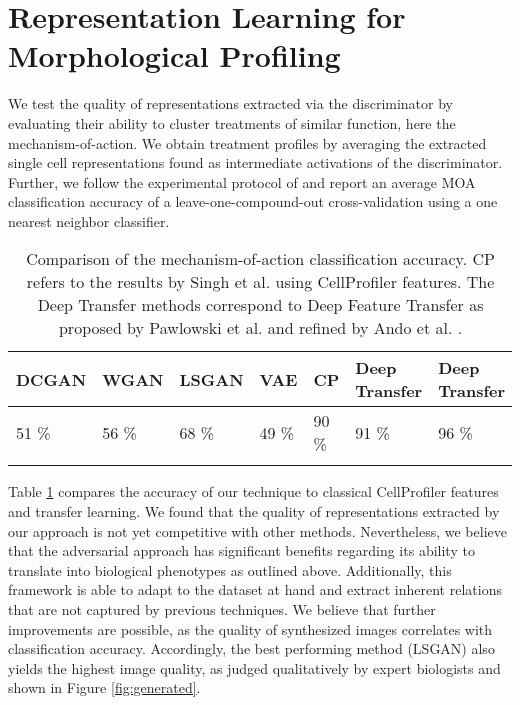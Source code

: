 \documentclass{article}
\begin{document}
\section{Representation Learning for Morphological Profiling}\label{moa}
We test the quality of representations extracted via the discriminator by evaluating their ability to cluster treatments of similar function, here the mechanism-of-action. We obtain treatment profiles by averaging the extracted single cell representations found as intermediate activations of the discriminator. Further, we follow the experimental protocol of \cite{Ljosa2013} and report an average MOA classification accuracy of a leave-one-compound-out cross-validation using a one nearest neighbor classifier.
\begin{table}
  \centering
  \begin{tabular}{lllllll}
  	\toprule
    DCGAN & WGAN & LSGAN & VAE \cite{pawlowski2016msc} & CP \cite{Singh2014} & Deep Transfer \cite{pawlowski2016automating}  & Deep Transfer \cite{ando2017improving} \\
    \midrule
    51 \%& 56 \% & 68 \% & 49 \% & 90 \% & 91 \% & 96 \% \\
    \bottomrule \\
  \end{tabular}
  \caption{Comparison of the mechanism-of-action classification accuracy. CP refers to the results by Singh et al. \cite{Singh2014} using CellProfiler features. The Deep Transfer methods correspond to Deep Feature Transfer as proposed by Pawlowski et al. \cite{pawlowski2016automating} and refined by Ando et al. \cite{ando2017improving}.}
  \label{moa-results}
  \vspace{-0.5cm}
\end{table}

Table \ref{moa-results} compares the accuracy of our technique to classical CellProfiler features and transfer learning. We found that the quality of representations extracted by our approach is not yet competitive with other methods. Nevertheless, we believe that the adversarial approach has significant benefits regarding its ability to translate into biological phenotypes as outlined above. Additionally, this framework is able to adapt to the dataset at hand and extract inherent relations that are not captured by previous techniques. We believe that further improvements are possible, as the quality of synthesized images correlates with classification accuracy. Accordingly, the best performing method (LSGAN) also yields the highest image quality, as judged qualitatively by expert biologists and shown in Figure \ref{fig:generated}.
\end{document}
